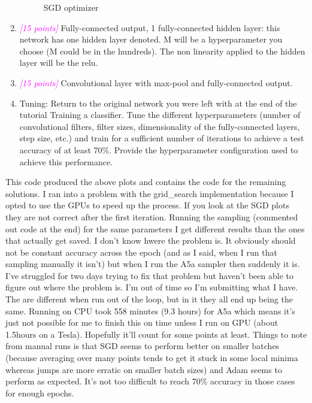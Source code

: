 \documentclass{article}
\newcommand{\1}{\mathbf{1}}
\newcommand{\points}[1]{\small\textcolor{magenta}{\emph{[#1 points]}} \normalsize}
\begin{document}
\begin{enumerate}
\begin{figure}
        \caption{SGD optimizer}
    \end{figure}
    \newpage
    \item \points{15} Fully-connected output, 1 fully-connected hidden layer: this network has one hidden layer denoted. M will be a hyperparameter you choose (M could be in the hundreds). The non linearity applied to the hidden layer will be the relu.
    \item \points{15} Convolutional layer with max-pool and fully-connected output.
    \item Tuning: Return to the original network you were left with at the end of the tutorial Training a classifier. Tune the different hyperparameters (number of convolutional filters, filter sizes, dimensionality of the fully-connected layers, step size, etc.) and train for a sufficient number of iterations to achieve a test accuracy of at least 70\%. Provide the hyperparameter configuration used to achieve this performance.
\end{enumerate}

This code produced the above plots and contains the code for the remaining solutions. I ran into a problem with the grid\_search implementation because I opted to use the GPUs to speed up the process. If you look at the SGD plots they are not correct after the first iteration. Running the sampling (commented out code at the end) for the same parameters I get different results than the ones that actually get saved. I don't know hwere the problem is. It obviously should not be constant accuracy across the epoch (and as I said, when I run that sampling manually it isn't) but when I run the A5a sampler then suddenly it is. I've struggled for two days trying to fix that problem but haven't been able to figure out where the problem is. I'm out of time so I'm submitting what I have. The are different when run out of the loop, but in it they all end up being the same. Running on CPU took 558 minutes (9.3 hours) for A5a which means it's just not possible for me to finish this on time unless I run on GPU (about 1.5hours on a Tesla). Hopefully it'll count for some points at least. Things to note from manual runs is that SGD seems to perform better on smaller batches (because averaging over many points tends to get it stuck in some local minima whereas jumps are more erratic on smaller batch sizes) and Adam seems to perform as expected. It's not too difficult to reach 70\% accuracy in those cases for enough epochs. 
  
\end{document}
